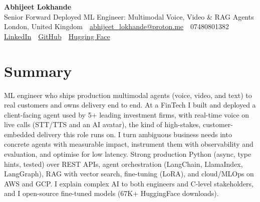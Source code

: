 \documentclass[10pt,a4paper]{article}
\newcommand{\sep}{\,\textcolor{accent!60}{\textbar}\,}
\begin{document}
\begin{center}
  {\fontsize{24}{26}\selectfont\bfseries Abhijeet Lokhande}\\[3pt]
  {\color{accent}\large Senior Forward Deployed ML Engineer: Multimodal Voice, Video \& RAG Agents}\\[5pt]
  {\small
    London, United Kingdom \sep
    \href{mailto:abhijeet_lokhande@proton.me}{abhijeet\_lokhande@proton.me} \sep
    07480801382 \\[2pt]
    \href{https://www.linkedin.com/in/ablds/}{LinkedIn} \sep
    \href{https://github.com/abhijeetscode}{GitHub} \sep
    \href{https://huggingface.co/ab-ai}{Hugging Face}
  }
\end{center}
\vspace{2pt}

\section{Summary}
ML engineer who ships production multimodal agents (voice, video, and text) to real customers and owns delivery end to end. At a FinTech I built and deployed a client-facing agent used by 5+ leading investment firms, with real-time voice on live calls (STT/TTS and an AI avatar), the kind of high-stakes, customer-embedded delivery this role runs on. I turn ambiguous business needs into concrete agents with measurable impact, instrument them with observability and evaluation, and optimise for low latency. Strong production Python (async, type hints, tested) over REST APIs, agent orchestration (LangChain, LlamaIndex, LangGraph), RAG with vector search, fine-tuning (LoRA), and cloud/MLOps on AWS and GCP. I explain complex AI to both engineers and C-level stakeholders, and I open-source fine-tuned models (67K+ HuggingFace downloads).

\end{document}
